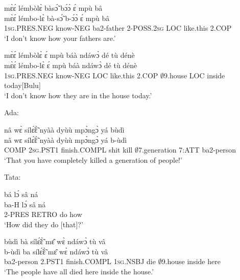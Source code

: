\begin{exe} 
\exN\label{215}
  \glll mɛ̀ɛ́ lémbòlɛ̀ bàsɔ̃́ bɔ́ɔ̀ ɛ́ mpù bâ \\
       mɛ̀ɛ́ lémbo-lɛ̀ bà-sɔ̃́ b-ɔ́ɔ̀ ɛ́ mpù bâ \\
       1\textsc{sg}.PRES.NEG know-NEG ba2-father 2-POSS.2\textsc{sg} LOC like.this 2.COP  \\
    \trans `I don't know how your fathers are.'
\end{exe}

\begin{exe} 
\exN\label{216}
  \glll mɛ̀ɛ́ lémbòlɛ̀ ɛ́ mpù báà ndáwɔ̀ dé tù dénè \\
      mɛ̀ɛ́ lémbo-lɛ̀ ɛ́ mpù báà ndáwɔ̀ dé tù dénè \\
        1\textsc{sg}.PRES.NEG know-NEG LOC like.this 2.COP $\emptyset$9.house LOC inside today[Bulu]  \\
    \trans `I don't know how they are in the house today.'
\end{exe}

\noindent Ada:

\begin{exe} 
\exN\label{217} 
  \glll nâ wɛ̀ sílɛ̃́ɛ̃̀ nyàà dyùù mpɔ̀ngɔ̀ yá bùdì\\
        nâ wɛ sílɛ̃́ɛ̃̀ nyàà dyùù mpɔ̀ngɔ̀ yá b-ùdì\\
         COMP 2\textsc{sg}.PST1 finish.COMPL shit kill $\emptyset$7.generation 7:ATT ba2-person\\
    \trans `That you have completely killed a generation of people!'
\end{exe}

\noindent Tata:

\begin{exe} 
\exN\label{218}
  \glll bá lɔ́ sâ ná \\
        ba-H lɔ́ sâ ná \\
         2-PRES RETRO do how \\
    \trans `How did they do [that]?'
\end{exe}

\begin{exe} 
\exN\label{219}
  \glll bùdì bà sílɛ̃́ɛ̃̀ mɛ̂ wɛ̀ ndáwɔ̀ tù vâ \\
        b-ùdì ba sílɛ̃́ɛ̃̀ mɛ̂ wɛ̀ ndáwɔ̀ tù vâ \\
       ba2-person 2.PST1 finish.COMPL 1\textsc{sg}.NSBJ die $\emptyset$9.house inside here  \\
    \trans `The people have all died here inside the house.'
\end{exe}


